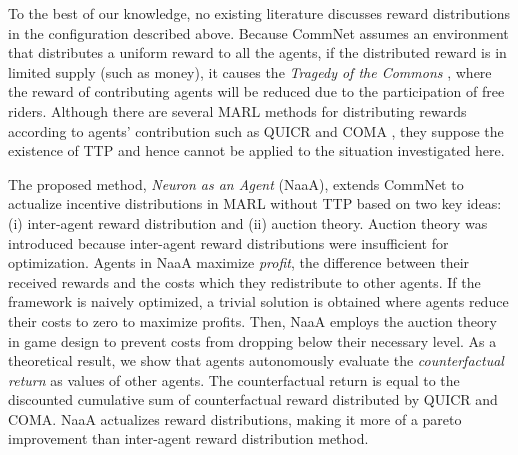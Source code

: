 To the best of our knowledge, no existing literature discusses reward distributions in the configuration described above.
Because CommNet assumes an environment that distributes a uniform reward to all the agents, 
if the distributed reward is in limited supply (such as money), it causes the {\em Tragedy of the Commons} \citep{lloyd1833two}, where the reward of contributing agents will be reduced due to the participation of free riders.
Although there are several MARL methods for distributing rewards according to agents' contribution such as QUICR \citep{agogino2006quicr} and COMA \citep{sukhbaatar2016learning}, they suppose the existence of TTP and hence cannot be applied to the situation investigated here.


The proposed method, {\em Neuron as an Agent} (NaaA), extends CommNet to actualize incentive distributions
in MARL without TTP based on two key ideas: (i) inter-agent reward distribution and (ii) auction theory.
Auction theory was introduced because inter-agent reward distributions were insufficient for optimization.
Agents in NaaA maximize {\em profit}, the difference between their received rewards and the costs which they redistribute to other agents.
If the framework is naively optimized, a trivial solution is obtained where agents reduce their costs to zero to maximize profits.
Then, NaaA employs the auction theory in game design to prevent costs from dropping below their necessary level.
As a theoretical result, we show that agents autonomously evaluate the {\em counterfactual return} as values of other agents.
The counterfactual return is equal to the discounted cumulative sum of counterfactual reward \citep{agogino2006quicr} distributed by QUICR and COMA.
NaaA actualizes reward distributions, making it more of a pareto improvement than inter-agent reward distribution method.

